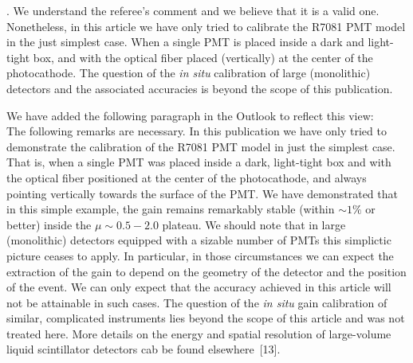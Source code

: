 \documentclass[a4paper,11pt]{article}
\begin{document}
. We understand the referee's comment and we believe that it is a valid one.  
Nonetheless, in this article we have only tried to calibrate the R7081 PMT model in the just simplest case. 
When a single PMT is placed inside a dark and light-tight box, and with the optical fiber placed (vertically) at the center of the photocathode. 
The question of the \emph{in situ} calibration of large (monolithic) detectors and the associated accuracies is beyond the scope of this publication. 

We have added the following paragraph in the Outlook to reflect this view:
\\[1ex]

The following remarks are necessary. 
In this publication we have only tried to demonstrate the calibration of the R7081 PMT model in just the simplest case. 
That is, when a single PMT was placed inside a dark, light-tight box and with the optical fiber positioned at the center of the photocathode, and always pointing vertically towards the surface of the PMT. 
We have demonstrated that in this simple example, the gain remains remarkably stable (within $\sim 1\%$ or better) inside the $\mu \sim 0.5 - 2.0$ plateau. 
We should note that in large (monolithic) detectors equipped with a sizable number of PMTs this simplictic picture ceases to apply. 
In particular, in those circumstances we can expect the extraction of the gain to depend on the geometry of the detector and the position of the event. 
We can only expect that the accuracy achieved in this article will not be attainable in such cases. 
The question of the \emph{in situ} gain calibration of similar, complicated instruments lies beyond the scope of this article and was not treated here. 
More details on the energy and spatial resolution of large-volume liquid scintillator detectors cab be found elsewhere~[13]. 
\end{document}
